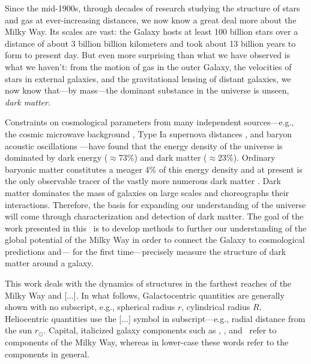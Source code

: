 Since the mid-1900s, through decades of research studying the structure of stars
and gas at ever-increasing distances, we now know a great deal more about the
Milky Way. Its scales are vast: the Galaxy hosts at least 100 billion stars over
a distance of about 3 billion billion kilometers and took about 13 billion years
to form to present day. But even more surprising than what we have observed is
what we haven't: from the motion of gas in the outer Galaxy, the velocities of
stars in external galaxies, and the gravitational lensing of distant galaxies,
we now know that---by mass---the dominant substance in the universe is unseen,
\emph{dark matter}.

Constraints on cosmological parameters from many independent sources---e.g., the
cosmic microwave background \citep{planck15}, Type Ia supernova distances
\citep{riess98, perlmutter99}, and baryon acoustic oscillations
\citep{eisenstein05}---have found that the energy density of the universe is
dominated by dark energy ($\approx$73\%) and dark matter ($\approx$23\%).
Ordinary baryonic matter constitutes a meager 4\% of this energy density and at
present is the only observable tracer of the vastly more numerous dark matter
\citep[though the search for the dark matter particle is
underway;][]{aprile11,luxdm12}. Dark matter dominates the mass of galaxies on
large scales and choreographs their interactions. Therefore, the basis for
expanding our understanding of the universe will come through characterization
and detection of dark matter. The goal of the work presented in this \article\
is to develop methods to further our understanding of the global potential of
the Milky Way in order to connect the Galaxy to cosmological predictions and---
for the first time---precisely measure the structure of dark matter around a
galaxy.


This work deals with the dynamics of structures in the farthest reaches of the
Milky Way and [...]. In what follows, Galactocentric quantities are generally
shown with no subscript, e.g., spherical radius $r$, cylindrical radius $R$.
Heliocentric quantities use the [...] symbol in subscript---e.g., radial
distance from the sun $r_\odot$. Capital, italicized galaxy components such as
\mwdisk, \mwbulge, and \mwhalo\ refer to components of the Milky Way, whereas in
lower-case these words refer to the components in general.

